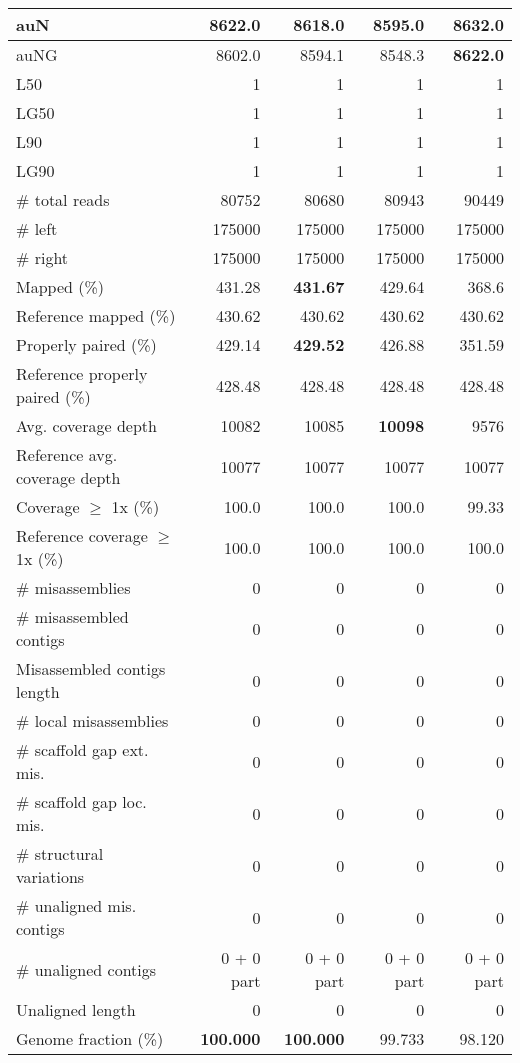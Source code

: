 \documentclass[12pt,a4paper]{article}
\begin{document}
\begin{table}[ht]
\begin{center}
\begin{tabular}{|l*{4}{|r}|}
auN & 8622.0 & 8618.0 & 8595.0 & {\bf 8632.0} \\ \hline
auNG & 8602.0 & 8594.1 & 8548.3 & {\bf 8622.0} \\ \hline
L50 & 1 & 1 & 1 & 1 \\ \hline
LG50 & 1 & 1 & 1 & 1 \\ \hline
L90 & 1 & 1 & 1 & 1 \\ \hline
LG90 & 1 & 1 & 1 & 1 \\ \hline
\# total reads & 80752 & 80680 & 80943 & 90449 \\ \hline
\# left & 175000 & 175000 & 175000 & 175000 \\ \hline
\# right & 175000 & 175000 & 175000 & 175000 \\ \hline
Mapped (\%) & 431.28 & {\bf 431.67} & 429.64 & 368.6 \\ \hline
Reference mapped (\%) & 430.62 & 430.62 & 430.62 & 430.62 \\ \hline
Properly paired (\%) & 429.14 & {\bf 429.52} & 426.88 & 351.59 \\ \hline
Reference properly paired (\%) & 428.48 & 428.48 & 428.48 & 428.48 \\ \hline
Avg. coverage depth & 10082 & 10085 & {\bf 10098} & 9576 \\ \hline
Reference avg. coverage depth & 10077 & 10077 & 10077 & 10077 \\ \hline
Coverage $\geq$ 1x (\%) & 100.0 & 100.0 & 100.0 & 99.33 \\ \hline
Reference coverage $\geq$ 1x (\%) & 100.0 & 100.0 & 100.0 & 100.0 \\ \hline
\# misassemblies & 0 & 0 & 0 & 0 \\ \hline
\# misassembled contigs & 0 & 0 & 0 & 0 \\ \hline
Misassembled contigs length & 0 & 0 & 0 & 0 \\ \hline
\# local misassemblies & 0 & 0 & 0 & 0 \\ \hline
\# scaffold gap ext. mis. & 0 & 0 & 0 & 0 \\ \hline
\# scaffold gap loc. mis. & 0 & 0 & 0 & 0 \\ \hline
\# structural variations & 0 & 0 & 0 & 0 \\ \hline
\# unaligned mis. contigs & 0 & 0 & 0 & 0 \\ \hline
\# unaligned contigs & 0 + 0 part & 0 + 0 part & 0 + 0 part & 0 + 0 part \\ \hline
Unaligned length & 0 & 0 & 0 & 0 \\ \hline
Genome fraction (\%) & {\bf 100.000} & {\bf 100.000} & 99.733 & 98.120 \\ \hline

\end{tabular}
\end{center}
\end{table}
\end{document}
